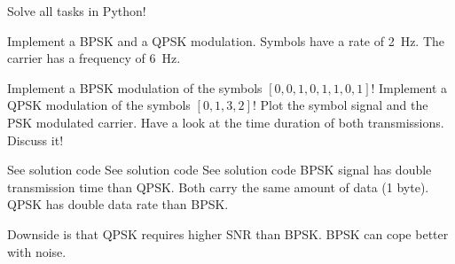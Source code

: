 \begin{question}[subtitle={Python Programming: PSK Modulation}]
	Solve all tasks in Python!
	
	Implement a BPSK and a QPSK modulation. Symbols have a rate of \SI{2}{Hz}. The carrier has a frequency of \SI{6}{Hz}.
	
	\begin{tasks}
		\task
		Implement a BPSK modulation of the symbols $\left[0, 0, 1, 0, 1, 1, 0, 1\right]$!
		\task
		Implement a QPSK modulation of the symbols $\left[0, 1, 3, 2\right]$!
		\task
		Plot the symbol signal and the PSK modulated carrier.
		\task
		Have a look at the time duration of both transmissions. Discuss it!
	\end{tasks}
\end{question}

\begin{solution}
	\begin{tasks}
		\task
		See solution code
		\task
		See solution code
		\task
		See solution code
		\task
		BPSK signal has double transmission time than QPSK. Both carry the same amount of data (1 byte). QPSK has double data rate than BPSK.
		
		Downside is that QPSK requires higher SNR than BPSK. BPSK can cope better with noise.
	\end{tasks}
\end{solution}

%
